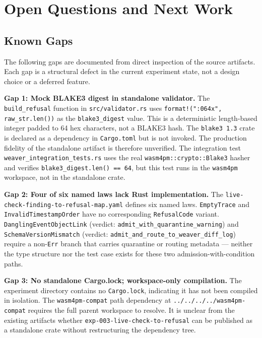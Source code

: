 
\section{Open Questions and Next Work}
\label{sec:otel-weaver-exp-003-live-check-to-refusal-open}

\subsection{Known Gaps}
\label{sec:otel-weaver-exp-003-live-check-to-refusal-open-gaps}

The following gaps are documented from direct inspection of the source artifacts.
Each gap is a structural defect in the current experiment state, not a design choice
or a deferred feature.

\textbf{Gap 1: Mock BLAKE3 digest in standalone validator.}
The \texttt{build\_refusal} function in \texttt{src/validator.rs} uses
\texttt{format!("{:064x}", raw\_str.len())} as the \texttt{blake3\_digest} value.
This is a deterministic length-based integer padded to 64 hex characters, not a
BLAKE3 hash. The \texttt{blake3 1.3} crate is declared as a dependency in
\texttt{Cargo.toml} but is not invoked. The production fidelity of the standalone
artifact is therefore unverified. The integration test \texttt{weaver\_integration\_tests.rs}
uses the real \texttt{wasm4pm::crypto::Blake3} hasher and verifies
\texttt{blake3\_digest.len() == 64}, but this test runs in the \texttt{wasm4pm}
workspace, not in the standalone crate.

\textbf{Gap 2: Four of six named laws lack Rust implementation.}
The \texttt{live-check-finding-to-refusal-map.yaml} defines six named laws.
\texttt{EmptyTrace} and \texttt{InvalidTimestampOrder} have no corresponding
\texttt{RefusalCode} variant. \texttt{DanglingEventObjectLink} (verdict:
\texttt{admit\_with\_quarantine\_warning}) and \texttt{SchemaVersionMismatch}
(verdict: \texttt{admit\_and\_route\_to\_weaver\_diff\_log}) require a non-\texttt{Err}
branch that carries quarantine or routing metadata --- neither the type structure
nor the test case exists for these two admission-with-condition paths.

\textbf{Gap 3: No standalone Cargo.lock; workspace-only compilation.}
The experiment directory contains no \texttt{Cargo.lock}, indicating it has not been
compiled in isolation. The \texttt{wasm4pm-compat} path dependency at
\texttt{../../../../wasm4pm-compat} requires the full parent workspace to resolve.
It is unclear from the existing artifacts whether \texttt{exp-003-live-check-to-refusal}
can be published as a standalone crate without restructuring the dependency tree.

